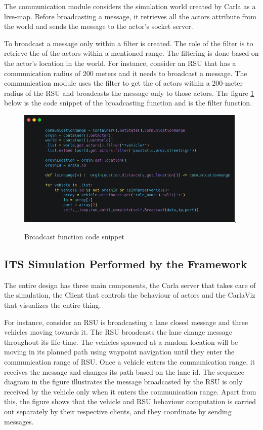 The communication module considers the simulation world created by Carla as a live-map. Before broadcasting a message, it retrieves all the actors  attribute from the world and sends the message to the actor's socket server.

To broadcast a message only within a filter is created. The role of the filter is to retrieve the  of the actors within a mentioned range. The filtering is done based on the actor's location in the world.  For instance, consider an RSU that has a communication radius of 200 meters and it needs to broadcast a message. The communication module uses the filter to get the  of actors within a 200-meter radius of the RSU and broadcasts the message only to those actors. The figure \ref{snip} below is the code snippet of the broadcasting function and  is the filter function.

\begin{figure}[h!]
    \centering
    \includegraphics[width=11cm]{Framework/Images/carbon.png}.
    \caption{Broadcast function code snippet}
    \label{snip}
\end{figure}


\subsection{ITS Simulation Performed by the Framework}
 
 The entire design has three main components, the Carla server that takes care of the simulation, the Client that controls the behaviour of actors and the CarlaViz that visualizes the entire thing. 

For instance, consider an RSU is broadcasting a lane closed message and three vehicles moving towards it. The RSU broadcasts the lane change message throughout its life-time. The vehicles spawned at a random location will be moving in its planned path using waypoint navigation until they enter the communication range of RSU. Once a vehicle enters the communication range, it receives the message and changes its path based on the lane id. The sequence diagram in the figure illustrates the message broadcasted by the RSU is only received by the vehicle only when it enters the communication range. Apart from this, the figure shows that the vehicle and RSU behaviour computation is carried out separately by their respective clients, and they coordinate by sending messages.
 
